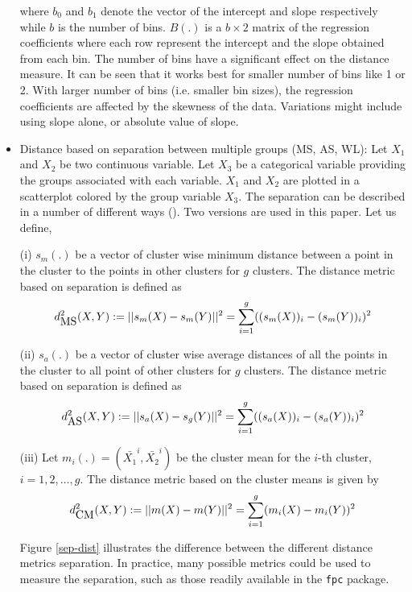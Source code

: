 \documentclass[12]{article}
\newcommand{\red}[1]{{\color{red} #1}}
\begin{document}
\begin{itemize}
where $b_0$ and $b_1$ denote the vector of the intercept and slope respectively while $b$ is the number of bins. $B(.)$ is a $b \times 2$ matrix of the regression coefficients where each row represent the  intercept and the slope obtained from each bin. The number of bins have a significant effect on the distance measure. It can be seen that it works best for smaller number of bins like 1 or 2. With larger number of bins (i.e. smaller bin sizes), the regression coefficients are affected by the skewness of the data. Variations might include using slope alone, or absolute value of slope.

\item Distance based on separation between multiple groups (MS, AS, WL): Let $X_1$ and $X_2$ be two continuous variable. Let $X_3$ be a categorical variable providing the groups associated with each variable. $X_1$ and $X_2$ are plotted in a scatterplot colored by the group variable $X_3$. The separation can be described in a number of different ways (\cite{hennig:2010}). Two versions are used in this paper. Let us define, 

(i) $s_{m}(.)$ be a vector of cluster wise minimum distance between a point in the cluster to the points in other clusters for $g$ clusters. The distance metric based on separation is defined as
\[
d^2_{\hbox{MS}}(X, Y):= ||s_m(X) - s_m(Y)||^2 = \sum_{i = 1}^g ((s_m(X))_i - (s_m(Y))_i)^2
\]

(ii)  $s_{a}(.)$ be a vector of cluster wise average distances of all the points in the cluster to all point of other clusters for $g$ clusters. The distance metric based on separation is defined as
\[
d^2_{\hbox{AS}}(X, Y):= ||s_a(X) - s_g(Y)||^2 = \sum_{i = 1}^g ((s_a(X))_i - (s_a(Y))_i)^2
\]

(iii) Let $m_i(.) = (\bar{X_1}^i, \bar{X_2}^i)$ be the cluster mean for the $i$-th cluster, $i = 1, 2, \dots, g$. The distance metric based on the cluster means is given by
\[
d^2_{\hbox{CM}}(X, Y):= ||m(X) - m(Y)||^2 = \sum_{i=1}^g (m_i(X) - m_i(Y))^2
\]


Figure \ref{sep-dist} illustrates the difference between the different distance metrics separation. In practice, many possible metrics could be used to measure the separation, such as those readily available in the {\tt fpc} package.


\end{itemize}
\end{document}
